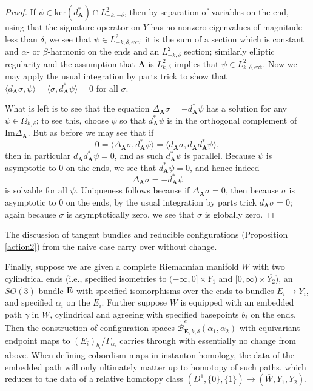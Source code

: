 \documentclass[10pt,a4paper]{amsart}
\theoremstyle{definition}
\theoremstyle{remark}
\numberwithin{figure}{qchap}
\begin{document}
\begin{proof}
If $\psi \in \text{ker}(d_{\mathbf{A}}^*) \cap L^2_{-k,-\delta}$, then by separation of variables on the end, using that the signature operator on $Y$ has no nonzero eigenvalues of magnitude less than $\delta$, we see that $\psi \in L^2_{-k,\delta,\text{ext}}$: it is the sum of a section which is constant and $\alpha$- or $\beta$-harmonic on the ends and an $L^2_{-k,\delta}$ section; similarly elliptic regularity and the assumption that $\mathbf{A}$ is $L^2_{k,\delta}$ implies that $\psi \in L^2_{k,\delta,\text{ext}}$. Now we may apply the usual integration by parts trick to show that $\langle d_{\mathbf{A}} \sigma, \psi \rangle = \langle \sigma, d_{\mathbf{A}}^* \psi \rangle = 0$ for all $\sigma$.

What is left is to see that the equation $\Delta_{\mathbf{A}} \sigma = -d_{\mathbf{A}}^* \psi$ has a solution for any $\psi \in \Omega^1_{k,\delta}$; to see this, choose $\psi$ so that $d_{\mathbf{A}}^* \psi$ is in the orthogonal complement of $\text{Im} \Delta_{\mathbf{A}}$. But as before we may see that if 
$$0 = \langle \Delta_{\mathbf{A}} \sigma, d_{\mathbf{A}}^* \psi \rangle = \langle d_{\mathbf{A}} \sigma, d_{\mathbf{A}} d_{\mathbf{A}}^* \psi \rangle,$$ 
then in particular $d_{\mathbf{A}} d_{\mathbf{A}}^* \psi = 0$, and as such $d_{\mathbf{A}}^* \psi$ is parallel. Because $\psi$ is asymptotic to $0$ on the ends, we see that $d_{\mathbf{A}}^* \psi = 0$, and hence indeed
$$\Delta_{\mathbf{A}} \sigma = -d_{\mathbf{A}}^* \psi$$ 
is solvable for all $\psi$. Uniqueness follows because if $\Delta_{\mathbf{A}} \sigma = 0$, then because $\sigma$ is asymptotic to $0$ on the ends, by the usual integration by parts trick $d_{\mathbf{A}} \sigma = 0$; again because $\sigma$ is asymptotically zero, we see that $\sigma$ is globally zero. 
\end{proof}

The discussion of tangent bundles and reducible configurations (Proposition \ref{action2}) from the naive case carry over without change.

Finally, suppose we are given a complete Riemannian manifold $W$ with two cylindrical ends (i.e., specified isometries to $(-\infty, 0] \times Y_1$ and $[0,\infty) \times \overline{Y_2}$), an $SO(3)$ bundle $\bf E$ with specified isomorphisms over the ends to bundles $E_i \to Y_i$, and specified $\alpha_i$ on the $E_i$. Further suppose $W$ is equipped with an embedded path $\gamma$ in $W$, cylindrical and agreeing with specified basepoints $b_i$ on the ends. Then the construction of configuration spaces $\widetilde{\mathcal B}^{e}_{\mathbf{E},k,\delta}(\alpha_1, \alpha_2)$ with equivariant endpoint maps to $(E_i)_{b_i}/\Gamma_{\alpha_i}$ carries through with essentially no change from above. When defining cobordism maps in instanton homology, the data of the embedded path will only ultimately matter up to homotopy of such paths, which reduces to the data of a relative homotopy class $(D^1, \{0\}, \{1\}) \to (\overline W, Y_1, Y_2)$.
\end{document}
